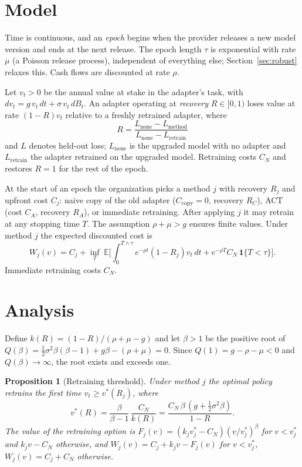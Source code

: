 \documentclass[preprint,12pt,authoryear]{elsarticle}
\newcommand{\E}{\mathbb{E}}
\newtheorem{proposition}{Proposition}
\begin{document}
\section{Model}\label{sec:model}

Time is continuous, and an \emph{epoch} begins when the provider releases a new model version and ends at the next
release. The epoch length $\tau$ is exponential with rate $\mu$ (a Poisson release process), independent of
everything else; Section~\ref{sec:robust} relaxes this. Cash flows are discounted at rate $\rho$.

Let $v_t>0$ be the annual value at stake in the adapter's task, with
$dv_t = g\,v_t\,dt + \sigma\,v_t\,dB_t$. An adapter operating at \emph{recovery} $R\in[0,1)$ loses value at rate
$(1-R)v_t$ relative to a freshly retrained adapter, where
\begin{equation}
R=\frac{L_{\text{none}}-L_{\text{method}}}{L_{\text{none}}-L_{\text{retrain}}}
\end{equation}
and $L$ denotes held-out loss; $L_{\text{none}}$ is the upgraded model with no adapter and $L_{\text{retrain}}$ the
adapter retrained on the upgraded model. Retraining costs $C_N$ and restores $R=1$ for the rest of the epoch.

At the start of an epoch the organization picks a method $j$ with recovery $R_j$ and upfront cost $C_j$: naive copy
of the old adapter ($C_{\text{copy}}=0$, recovery $R_C$), ACT (cost $C_A$, recovery $R_A$), or immediate retraining.
After applying $j$ it may retrain at any stopping time $T$. The assumption $\rho+\mu>g$ ensures finite values. Under
method $j$ the expected discounted cost is
\begin{equation}
W_j(v)=C_j+\inf_{T}\;\E\Big[\int_0^{T\wedge\tau}e^{-\rho t}(1-R_j)v_t\,dt+e^{-\rho T}C_N\,\mathbf 1\{T<\tau\}\Big].
\end{equation}
Immediate retraining costs $C_N$.

\section{Analysis}\label{sec:analysis}

Define $k(R)=(1-R)/(\rho+\mu-g)$ and let $\beta>1$ be the positive root of
$Q(\beta)=\tfrac12\sigma^2\beta(\beta-1)+g\beta-(\rho+\mu)=0$. Since $Q(1)=g-\rho-\mu<0$ and
$Q(\beta)\to\infty$, the root exists and exceeds one.

\begin{proposition}[Retraining threshold]\label{prop:thr}
Under method $j$ the optimal policy retrains the first time $v_t\ge v^*(R_j)$, where
\begin{equation}
v^*(R)=\frac{\beta}{\beta-1}\,\frac{C_N}{k(R)}=\frac{C_N\,\beta\,(g+\tfrac12\sigma^2\beta)}{1-R}.
\end{equation}
The value of the retraining option is $F_j(v)=(k_jv^*_j-C_N)(v/v^*_j)^\beta$ for $v<v^*_j$ and $k_jv-C_N$ otherwise, and
$W_j(v)=C_j+k_jv-F_j(v)$ for $v<v^*_j$, $W_j(v)=C_j+C_N$ otherwise.
\end{proposition}
\end{document}
